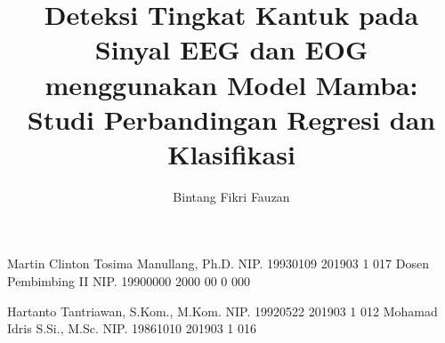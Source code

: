 \documentclass[article]{report} %
\begin{document}

    
\title{Deteksi Tingkat Kantuk pada Sinyal EEG dan EOG menggunakan Model Mamba: Studi Perbandingan Regresi dan Klasifikasi}
    
    \author{Bintang Fikri Fauzan}
	
	\dosbingA%
		{Martin Clinton Tosima Manullang, Ph.D.} 
		{NIP. 19930109 201903 1 017}	
	\dosbingB%
		{Dosen Pembimbing II}%
		{NIP. 19900000 2000 00 0 000}	%
		
	\pengujiA%
		{Hartanto Tantriawan, S.Kom., M.Kom.}%
		{NIP. 19920522 201903 1 012}	%
	\pengujiB%
		{Mohamad Idris S.Si., M.Sc.}%
		{NIP. 19861010 201903 1 016}	%

	\sloppy %
    \setcounter{page}{1} %
\end{document}
